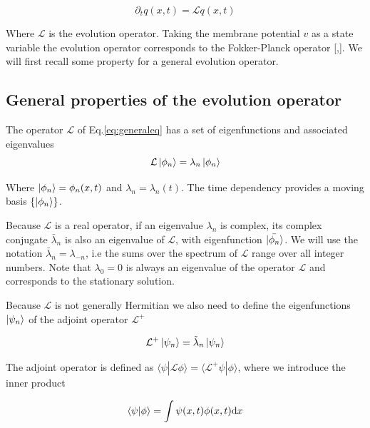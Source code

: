 \documentclass[12pt,twoside]{report}
\def \dd  {{\rm d}}
\begin{document}
\begin{equation}
\label{eq:generaleq}
\partial_t q(x,t)=\mathcal{L}q(x,t)
\end{equation}

Where $\mathcal{L}$  is the evolution operator. Taking the membrane potential $v$ as a state variable the evolution operator corresponds to the Fokker-Planck operator [\cite{MatGiu02},\cite{SchOst13}]. We will first recall some property for a general evolution operator.



\subsection{General properties of the evolution operator}
The operator $\mathcal{L}$ of Eq.\ref{eq:generaleq} has a set of eigenfunctions and associated eigenvalues
\begin{equation}
\label{eq:fokkerplanckoperator}
\mathcal{L}\ket{\phi_n}=\lambda_n\ket{\phi_n}
\end{equation}

Where $\ket{\phi_n}=\phi_n(x,t)$ and $\lambda_n=\lambda_n(t)$.
The time dependency provides a moving basis $\{\ket{\phi_n}\}$. 

Because $\mathcal{L}$ is a real operator, if an eigenvalue $\lambda_n$ is complex, its complex conjugate $\bar{\lambda}_n$  is also an eigenvalue of $\mathcal{L}$, with eigenfunction $\ket{\bar{\phi_n}}$. We will use the notation $\bar{\lambda}_n=\lambda_{-n}$, i.e the sums over the spectrum of $\mathcal{L}$ range over all integer numbers. Note that $\lambda_0=0$ is always an eigenvalue of the operator $\mathcal{L}$ and corresponds to the stationary solution.

Because $\mathcal{L}$ is not generally Hermitian we also need to define the eigenfunctions $\ket{\psi_n}$ of the adjoint operator $\mathcal{L}^{+}$ 

\begin{equation}
\label{eq:fokkerplanckoperatordega}
\mathcal{L}^+\ket{\psi_n}=\tilde{\lambda}_n\ket{\psi_n}
\end{equation}

The adjoint operator is defined as $\langle\psi|\mathcal{L}\phi\rangle=\langle\mathcal{L}^+\psi|\phi\rangle$, where we introduce the inner product

\begin{equation}
\label{eq:innerproduct}
\langle\psi|\phi\rangle=\int\psi(x,t)\phi(x,t)\dd x
\end{equation}
\end{document}
